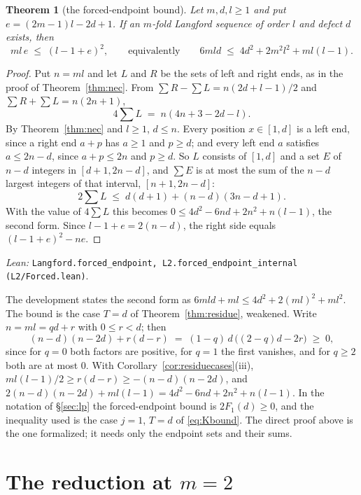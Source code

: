 \documentclass[11pt]{amsart}
\theoremstyle{plain}
\newtheorem{theorem}{Theorem}[section]
\theoremstyle{definition}
\theoremstyle{remark}
\newcommand{\lean}[1]{\par\smallskip
  {\small\raggedright\noindent\textit{Lean:} \texttt{#1}.\par}\smallskip}
\begin{document}
\begin{theorem}[the forced-endpoint bound]\label{thm:forced}
Let $m, d, l \ge 1$ and put $e = (2m-1)l - 2d + 1$. If an $m$-fold Langford sequence of
order $l$ and defect $d$ exists, then
\[
  ml\,e \;\le\; (l - 1 + e)^2, \qquad\text{equivalently}\qquad
  6mld \;\le\; 4d^2 + 2m^2l^2 + ml(l-1).
\]
\end{theorem}

\begin{proof}
Put $n = ml$ and let $L$ and $R$ be the sets of left and right ends, as in the proof of
Theorem~\ref{thm:nec}. From $\sum R - \sum L = n(2d+l-1)/2$ and
$\sum R + \sum L = n(2n+1)$,
\[
  4\sum L \;=\; n(4n + 3 - 2d - l).
\]
By Theorem~\ref{thm:nec} and $l \ge 1$, $d \le n$. Every position $x \in [1,d]$ is a left
end, since a right end $a + p$ has $a \ge 1$ and $p \ge d$; and every left end $a$
satisfies $a \le 2n - d$, since $a + p \le 2n$ and $p \ge d$. So $L$ consists of $[1,d]$
and a set $E$ of $n - d$ integers in $[d+1, 2n-d]$, and $\sum E$ is at most the sum of
the $n - d$ largest integers of that interval, $[n+1, 2n-d]$:
\[
  2\sum L \;\le\; d(d+1) + (n-d)(3n-d+1).
\]
With the value of $4\sum L$ this becomes $0 \le 4d^2 - 6nd + 2n^2 + n(l-1)$, the second
form. Since $l - 1 + e = 2(n-d)$, the right side equals $(l - 1 + e)^2 - ne$.
\end{proof}
\lean{Langford.forced\_endpoint, L2.forced\_endpoint\_internal (L2/Forced.lean)}

The development states the second form as $6mld + ml \le 4d^2 + 2(ml)^2 + ml^2$. The
bound is the case $T = d$ of Theorem~\ref{thm:residue}, weakened. Write
$n = ml = qd + r$ with $0 \le r < d$; then
\[
  (n - d)(n - 2d) + r(d-r) \;=\; (1-q)\,d\,\bigl((2-q)d - 2r\bigr) \;\ge\; 0,
\]
since for $q = 0$ both factors are positive, for $q = 1$ the first vanishes, and for
$q \ge 2$ both are at most $0$. With Corollary~\ref{cor:residuecases}(iii),
$ml(l-1)/2 \ge r(d-r) \ge -(n-d)(n-2d)$, and
$2(n-d)(n-2d) + ml(l-1) = 4d^2 - 6nd + 2n^2 + n(l-1)$. In the notation of
\S\ref{sec:lp} the forced-endpoint bound is $2F_1(d) \ge 0$, and the inequality used is
the case $j = 1$, $T = d$ of \eqref{eq:Kbound}. The direct proof above is the one
formalized; it needs only the endpoint sets and their sums.

\section{The reduction at \texorpdfstring{$m = 2$}{m = 2}}\label{sec:reduction}
\end{document}
